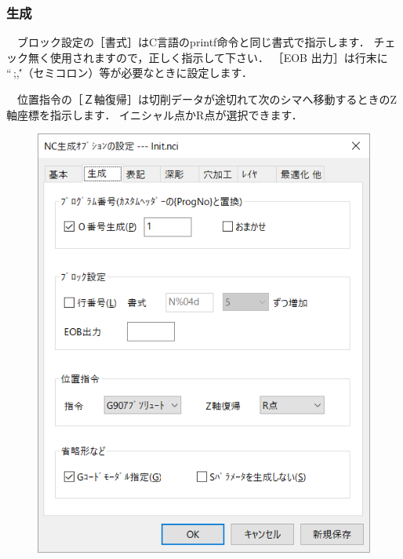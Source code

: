 \subsubsection{生成}
\begin{minipage}[t]{0.5\textwidth}
　ブロック設定の［書式］はC言語のprintf命令と同じ書式で指示します．
チェック無く使用されますので，正しく指示して下さい．
［EOB 出力］は行末に ``\,;,\''（セミコロン）等が必要なときに設定します．

　位置指令の［Ｚ軸復帰］は切削データが途切れて次のシマへ移動するときのZ軸座標を指示します．
イニシャル点かR点が選択できます．
\end{minipage}
\begin{minipage}[t]{0.5\textwidth}
\vspace*{-2zh}
\begin{figure}[H]
\centering
\includegraphics[scale=0.7]{No6/fig/init2.png}
\label{fig:init2.png}
\end{figure}
\end{minipage}


